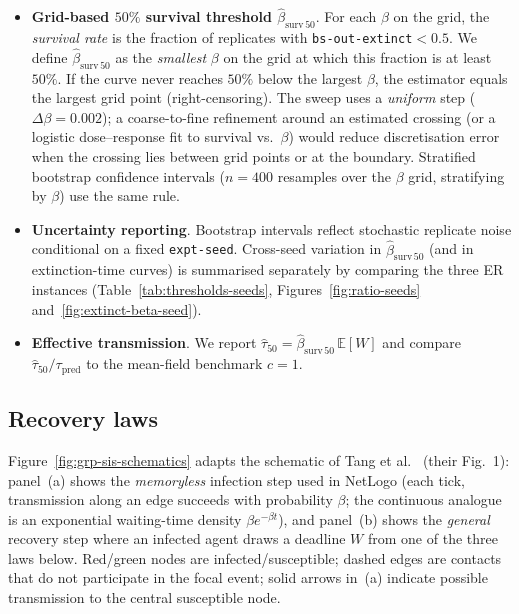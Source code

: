 \documentclass[11pt,a4paper]{article}
\begin{document}
\begin{itemize}[leftmargin=*]
  \item \textbf{Grid-based $50\%$ survival threshold $\hat{\beta}_{\mathrm{surv}\,50}$}. For each $\beta$ on the grid, the \emph{survival rate} is the fraction of replicates with \texttt{bs-out-extinct}${}<0.5$. We define $\hat{\beta}_{\mathrm{surv}\,50}$ as the \emph{smallest} $\beta$ on the grid at which this fraction is at least $50\%$. If the curve never reaches $50\%$ below the largest $\beta$, the estimator equals the largest grid point (right-censoring). The sweep uses a \emph{uniform} step ($\Delta\beta=0.002$); a coarse-to-fine refinement around an estimated crossing (or a logistic dose--response fit to survival vs.\ $\beta$) would reduce discretisation error when the crossing lies between grid points or at the boundary. Stratified bootstrap confidence intervals ($n{=}400$ resamples over the $\beta$ grid, stratifying by $\beta$) use the same rule.

  \item \textbf{Uncertainty reporting}. Bootstrap intervals reflect stochastic replicate noise conditional on a fixed \texttt{expt-seed}. Cross-seed variation in $\hat{\beta}_{\mathrm{surv}\,50}$ (and in extinction-time curves) is summarised separately by comparing the three ER instances (Table~\ref{tab:thresholds-seeds}, Figures~\ref{fig:ratio-seeds} and~\ref{fig:extinct-beta-seed}).

  \item \textbf{Effective transmission}. We report $\hat{\tau}_{50}=\hat{\beta}_{\mathrm{surv}\,50}\,\mathbb{E}[W]$ and compare $\hat{\tau}_{50}/\tau_{\mathrm{pred}}$ to the mean-field benchmark $c{=}1$.
\end{itemize}

\subsection{Recovery laws}

Figure~\ref{fig:grp-sis-schematics} adapts the schematic of Tang et al.\ \cite{Tang2025} (their Fig.~1): panel~(a) shows the \emph{memoryless} infection step used in NetLogo (each tick, transmission along an edge succeeds with probability $\beta$; the continuous analogue is an exponential waiting-time density $\beta e^{-\beta t}$), and panel~(b) shows the \emph{general} recovery step where an infected agent draws a deadline $W$ from one of the three laws below. Red/green nodes are infected/susceptible; dashed edges are contacts that do not participate in the focal event; solid arrows in~(a) indicate possible transmission to the central susceptible node.
\end{document}
